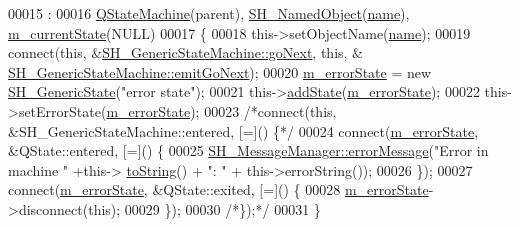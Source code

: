 \begin{DoxyCode}
00015                                                                             :
00016     \hyperlink{classQStateMachine}{QStateMachine}(parent), \hyperlink{classSH__NamedObject_a6ceff219e80ad3f5c36db5f4258e74fd}{SH\_NamedObject}(\hyperlink{classSH__NamedObject_a9f686c6f2a5bcc08ad03d0cee0151f0f}{name}), 
      \hyperlink{classSH__GenericStateMachine_a67b2e327c47acb0e3149b99e4ea1311e}{m\_currentState}(NULL)
00017 \{
00018     this->setObjectName(\hyperlink{classSH__NamedObject_a9f686c6f2a5bcc08ad03d0cee0151f0f}{name});
00019     connect(\textcolor{keyword}{this}, &\hyperlink{classSH__GenericStateMachine_aec37e33524182ab83bf300f1cc1a064e}{SH\_GenericStateMachine::goNext}, \textcolor{keyword}{this}, &
      \hyperlink{classSH__GenericStateMachine_a2e162a1da1f694d433cb9072b37ac530}{SH\_GenericStateMachine::emitGoNext});
00020     \hyperlink{classSH__GenericStateMachine_acdf020d8c235f727096da9e613d7e4d7}{m\_errorState} = \textcolor{keyword}{new} \hyperlink{classSH__GenericState}{SH\_GenericState}(\textcolor{stringliteral}{"error state"});
00021     this->\hyperlink{classSH__GenericStateMachine_af4402993e916573a589c9d28158b28d8}{addState}(\hyperlink{classSH__GenericStateMachine_acdf020d8c235f727096da9e613d7e4d7}{m\_errorState});
00022     this->setErrorState(\hyperlink{classSH__GenericStateMachine_acdf020d8c235f727096da9e613d7e4d7}{m\_errorState});
00023     \textcolor{comment}{/*connect(this, &SH\_GenericStateMachine::entered, [=]() \{*/}
00024     connect(\hyperlink{classSH__GenericStateMachine_acdf020d8c235f727096da9e613d7e4d7}{m\_errorState}, &QState::entered, [=]() \{
00025         \hyperlink{classSH__MessageManager_a0cb4f06cf67539457482ba1c8544eb06}{SH\_MessageManager::errorMessage}(\textcolor{stringliteral}{"Error in machine "} +this->
      \hyperlink{classSH__GenericStateMachine_a85c0c1c9d258ae991f84667412fa47cd}{toString}() + \textcolor{stringliteral}{": "} + this->errorString());
00026     \});
00027     connect(\hyperlink{classSH__GenericStateMachine_acdf020d8c235f727096da9e613d7e4d7}{m\_errorState}, &QState::exited, [=]() \{
00028         \hyperlink{classSH__GenericStateMachine_acdf020d8c235f727096da9e613d7e4d7}{m\_errorState}->disconnect(\textcolor{keyword}{this});
00029     \});
00030     \textcolor{comment}{/*\});*/}
00031 \}
\end{DoxyCode}


